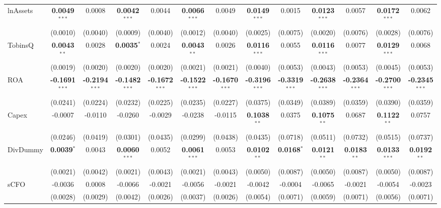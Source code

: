 \documentclass[11pt,a4paper]{article}
\begin{document}
\begin{table}[htbp]
\begin{tabular}{lcccccccccccc}
\midrule
lnAssets & \textbf{0.0049}$^{***}$ & 0.0008 & \textbf{0.0042}$^{***}$ & 0.0044 & \textbf{0.0066}$^{***}$ & 0.0049 & \textbf{0.0149}$^{***}$ & 0.0015 & \textbf{0.0123}$^{***}$ & 0.0057 & \textbf{0.0172}$^{***}$ & 0.0062 \\
 & (0.0010) & (0.0040) & (0.0009) & (0.0040) & (0.0012) & (0.0040) & (0.0025) & (0.0075) & (0.0020) & (0.0076) & (0.0028) & (0.0076) \\
TobinsQ & \textbf{0.0043}$^{**}$ & 0.0028 & \textbf{0.0035}$^{*}$ & 0.0024 & \textbf{0.0043}$^{**}$ & 0.0026 & \textbf{0.0116}$^{***}$ & 0.0055 & \textbf{0.0116}$^{***}$ & 0.0077 & \textbf{0.0129}$^{***}$ & 0.0068 \\
 & (0.0019) & (0.0020) & (0.0020) & (0.0020) & (0.0021) & (0.0021) & (0.0040) & (0.0053) & (0.0043) & (0.0053) & (0.0045) & (0.0053) \\
ROA & \textbf{-0.1691}$^{***}$ & \textbf{-0.2194}$^{***}$ & \textbf{-0.1482}$^{***}$ & \textbf{-0.1672}$^{***}$ & \textbf{-0.1522}$^{***}$ & \textbf{-0.1670}$^{***}$ & \textbf{-0.3196}$^{***}$ & \textbf{-0.3319}$^{***}$ & \textbf{-0.2638}$^{***}$ & \textbf{-0.2364}$^{***}$ & \textbf{-0.2700}$^{***}$ & \textbf{-0.2345}$^{***}$ \\
 & (0.0241) & (0.0224) & (0.0232) & (0.0225) & (0.0235) & (0.0227) & (0.0375) & (0.0349) & (0.0389) & (0.0359) & (0.0390) & (0.0359) \\
Capex & -0.0007 & -0.0110 & -0.0260 & -0.0029 & -0.0238 & -0.0115 & \textbf{0.1038}$^{**}$ & 0.0375 & \textbf{0.1075}$^{**}$ & 0.0687 & \textbf{0.1122}$^{**}$ & 0.0757 \\
 & (0.0246) & (0.0419) & (0.0301) & (0.0435) & (0.0299) & (0.0438) & (0.0435) & (0.0718) & (0.0511) & (0.0732) & (0.0515) & (0.0737) \\
DivDummy & \textbf{0.0039}$^{*}$ & 0.0043 & \textbf{0.0060}$^{***}$ & 0.0052 & \textbf{0.0061}$^{***}$ & 0.0053 & \textbf{0.0102}$^{**}$ & \textbf{0.0168}$^{*}$ & \textbf{0.0121}$^{**}$ & \textbf{0.0183}$^{**}$ & \textbf{0.0133}$^{***}$ & \textbf{0.0192}$^{**}$ \\
 & (0.0021) & (0.0042) & (0.0021) & (0.0043) & (0.0021) & (0.0043) & (0.0050) & (0.0087) & (0.0050) & (0.0087) & (0.0050) & (0.0087) \\
sCFO & -0.0036 & 0.0008 & -0.0066 & -0.0021 & -0.0056 & -0.0021 & -0.0042 & -0.0004 & -0.0065 & -0.0021 & -0.0054 & -0.0023 \\
 & (0.0028) & (0.0029) & (0.0042) & (0.0026) & (0.0037) & (0.0026) & (0.0054) & (0.0071) & (0.0059) & (0.0071) & (0.0056) & (0.0071) \\

\end{tabular}
\end{table}
\end{document}
